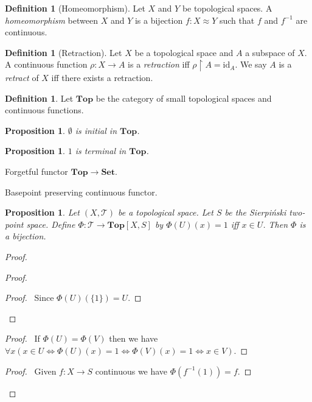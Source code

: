 \documentclass{book}
\let\qed\relax
\newtheorem{prop}[ax]{Proposition}
\theoremstyle{definition}
\newtheorem{df}[ax]{Definition}
\newcommand{\id}[1]{\ensuremath{\mathrm{id}_{#1}}}
\newcommand{\inv}[1]{\ensuremath{{#1}^{-1}}}
\newcommand{\Top}{\ensuremath{\mathbf{Top}}}
\begin{document}
\begin{df}[Homeomorphism]
Let $X$ and $Y$ be topological spaces. A \emph{homeomorphism} between $X$ and $Y$ is a bijection $f : X \approx Y$ such that $f$ and $\inv{f}$ are continuous.
\end{df}

\begin{df}[Retraction]
Let $X$ be a topological space and $A$ a subspace of $X$. A continuous function $\rho : X \rightarrow A$ is a \emph{retraction} iff $\rho \restriction A = \id{A}$. We say $A$ is a \emph{retract} of $X$ iff there exists a retraction.
\end{df}

\begin{df}
Let $\mathbf{Top}$ be the category of small topological spaces and continuous functions.
\end{df}

\begin{prop}
$\emptyset$ is initial in $\mathbf{Top}$.
\end{prop}

\begin{prop}
$1$ is terminal in $\mathbf{Top}$.
\end{prop}

Forgetful functor $\mathbf{Top} \rightarrow \mathbf{Set}$.

Basepoint preserving continuous functor.

\begin{prop}
Let $(X, \mathcal{T})$ be a topological space. Let $S$ be the Sierpi\'{n}ski two-point space. Define $\Phi : \mathcal{T} \rightarrow \Top[X,S]$ by $\Phi(U)(x) = 1$ iff $x \in U$. Then $\Phi$ is a bijection.
\end{prop}

\begin{proof}
\pf
{}
\begin{proof}
	\begin{proof}
		\pf\ Since $\Phi(U)(\{1\}) = U$.
	\end{proof}
\end{proof}
\begin{proof}
	\pf\ If $\Phi(U) = \Phi(V)$ then we have $\forall x (x \in U \Leftrightarrow \Phi(U)(x) = 1 \Leftrightarrow \Phi(V)(x) = 1 \Leftrightarrow x \in V)$.
\end{proof}
\begin{proof}
	\pf\ Given $f : X \rightarrow S$ continuous we have $\Phi(\inv{f}(1)) = f$.
\end{proof}
\qed
\end{proof}
\end{document}
